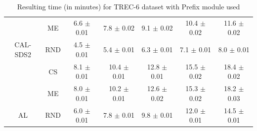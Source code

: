 \begin{table}[htbp]
\begin{tabular*}{\linewidth}{c|c|@{\extracolsep{\fill}}ccccc}
 & ME & 6.6 $\pm$ {\small 0.01} & 7.8 $\pm$ {\small 0.02} & 9.1 $\pm$ {\small 0.02} & 10.4 $\pm$ {\small 0.02} & 11.6 $\pm$ {\small 0.02}\\

\multirow{-3}{*}{\raggedright\arraybackslash CAL-SDS2} & RND & 4.5 $\pm$ {\small 0.01} & 5.4 $\pm$ {\small 0.01} & 6.3 $\pm$ {\small 0.01} & 7.1 $\pm$ {\small 0.01} & 8.0 $\pm$ {\small 0.01}\\
\midrule
 & CS & 8.1 $\pm$ {\small 0.01} & 10.4 $\pm$ {\small 0.01} & 12.8 $\pm$ {\small 0.01} & 15.5 $\pm$ {\small 0.02} & 18.4 $\pm$ {\small 0.02}\\

 & ME & 8.0 $\pm$ {\small 0.01} & 10.2 $\pm$ {\small 0.01} & 12.6 $\pm$ {\small 0.02} & 15.3 $\pm$ {\small 0.02} & 18.2 $\pm$ {\small 0.03}\\

\multirow{-3}{*}{\raggedright\arraybackslash AL} & RND & 6.0 $\pm$ {\small 0.01} & 7.8 $\pm$ {\small 0.01} & 9.8 $\pm$ {\small 0.01} & 12.0 $\pm$ {\small 0.01} & 14.5 $\pm$ {\small 0.01}\\
\bottomrule
\end{tabular*}
\caption{Resulting time (in minutes) for TREC-6 dataset with Prefix module used}
\label{tab:time_full_trec_10_prefix}
\end{table}
